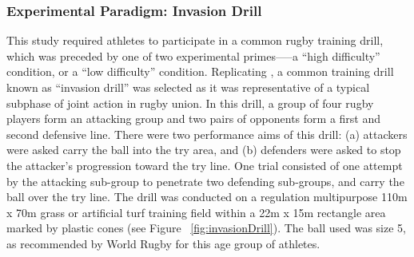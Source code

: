 \subsubsection{Experimental Paradigm: Invasion Drill}
This study required athletes to participate in a common rugby training drill, which was preceded by one of two experimental primes—--a ``high difficulty'' condition, or a ``low difficulty'' condition.   Replicating \textcite{Passos2011}, a common training drill known as ``invasion drill'' \citep{Biscombe1998} was selected as it was representative of a typical subphase of joint action in rugby union.
In this drill, a group of four rugby players form an attacking group and two pairs of opponents form a first and second defensive line.  There were two performance aims of this drill: (a) attackers were asked carry the ball into the try area, and (b) defenders were asked to stop the attacker’s progression toward the try line.
One trial consisted of one attempt by the attacking sub-group to penetrate two defending sub-groups, and carry the ball over the try line. The drill was conducted on a regulation multipurpose 110m x 70m grass or artificial turf training field within a 22m x 15m rectangle area marked by plastic cones (see Figure ~\ref{fig:invasionDrill}). The ball used was size 5, as recommended by World Rugby for this age group of athletes.




